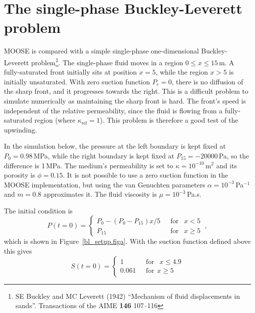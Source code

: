 \documentclass[]{scrreprt}
\begin{document}
\chapter{The single-phase Buckley-Leverett problem}
\label{bl}

MOOSE is compared with a simple single-phase one-dimensional
Buckley-Leverett problem\footnote{SE Buckley and MC Leverett (1942)
  ``Mechanism of fluid displacements in sands''.  Transactions of the
  AIME {\bf 146} 107--116}.  The single-phase fluid moves in a region
$0\leq x\leq 15$\,m.  A fully-saturated front initially sits at
position $x=5$, while the region $x>5$ is initially unsaturated.  With
zero suction function $P_{c} = 0$, there is no diffusion of the sharp
front, and it progresses towards the right.  This is a difficult
problem to simulate numerically as maintaining the sharp front is
hard.  The front's speed is independent of the relative permeability,
since the fluid is flowing from a fully-saturated region (where
$\kappa_{\mathrm{rel}}=1$).  This problem is therefore a good test of
the upwinding.


In the simulation below, the pressure at the left boundary is kept
fixed at $P_{0}=0.98$\,MPa, while the right boundary is kept fixed at
$P_{15}=-20000$\,Pa, so the difference is 1\,MPa.  The medium's
permeability is set to $\kappa = 10^{-10}\,\mathrm{m}^{2}$ and its
porosity is $\phi = 0.15$.  It is not possible to use a zero suction
function in the MOOSE implementation, but using the van Genuchten
parameters $\alpha = 10^{-3}$\,Pa$^{-1}$ and $m=0.8$ approximates it.
The fluid viscosity is $\mu = 10^{-3}$\,Pa.s.

The initial condition is
\begin{equation}
P(t=0) = \left\{
\begin{array}{ll}
P_{0} - (P_{0}-P_{15})x/5 & \ \ \ \mbox{for }\ \ x<5 \\
P_{15} & \ \ \ \mbox{for }\ \ x\geq 5  
\end{array}
\right. \ ,
\end{equation}
which is shown in
Figure~\ref{bl_setup.figa}.  With the suction function defined above
this gives
\begin{equation}
S(t=0) = \left\{
\begin{array}{ll}
1 & \ \ \ \mbox{for }\ \ x\leq 4.9 \\
0.061 & \ \ \ \mbox{for} \ \ x \geq 5
\end{array}
\right.
\end{equation}
\end{document}
